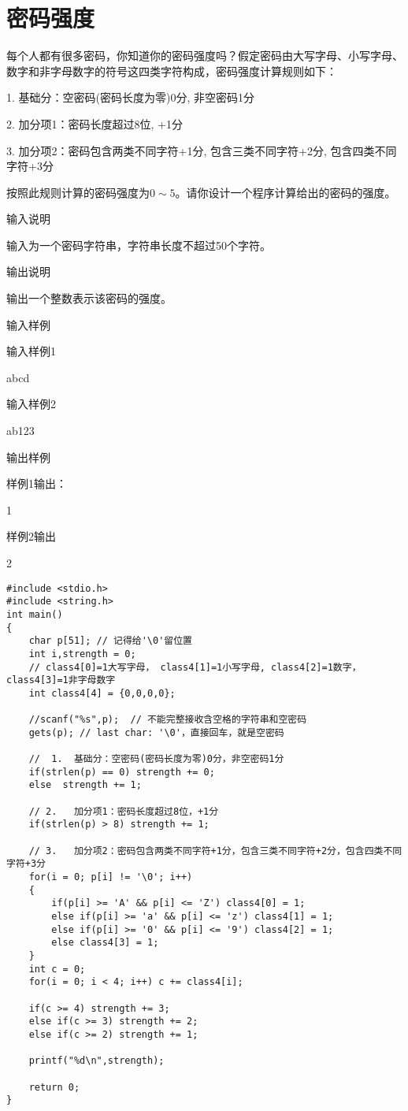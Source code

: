 \section{密码强度}
每个人都有很多密码，你知道你的密码强度吗？假定密码由大写字母、小写字母、数字和非字母数字的符号这四类字符构成，密码强度计算规则如下：

1.	基础分：空密码(密码长度为零)0分, 非空密码1分

2.	加分项1：密码长度超过8位, +1分

3.	加分项2：密码包含两类不同字符+1分, 包含三类不同字符+2分, 包含四类不同字符+3分

按照此规则计算的密码强度为$0\sim 5$。请你设计一个程序计算给出的密码的强度。

输入说明
	
输入为一个密码字符串，字符串长度不超过50个字符。

输出说明
	
输出一个整数表示该密码的强度。

输入样例
	
输入样例1

abcd

输入样例2

ab123

输出样例
	
样例1输出：

1

样例2输出

2

\begin{lstlisting}	
#include <stdio.h>
#include <string.h>
int main()
{
	char p[51]; // 记得给'\0'留位置
	int i,strength = 0;
	// class4[0]=1大写字母， class4[1]=1小写字母, class4[2]=1数字， class4[3]=1非字母数字 
	int class4[4] = {0,0,0,0};  
	
	//scanf("%s",p);  // 不能完整接收含空格的字符串和空密码 
	gets(p); // last char: '\0'，直接回车，就是空密码 
	
	// 	1.	基础分：空密码(密码长度为零)0分，非空密码1分 
	if(strlen(p) == 0) strength += 0;
	else  strength += 1;
	
	// 2.	加分项1：密码长度超过8位，+1分 
	if(strlen(p) > 8) strength += 1;
	
	// 3.	加分项2：密码包含两类不同字符+1分，包含三类不同字符+2分，包含四类不同字符+3分 
	for(i = 0; p[i] != '\0'; i++)
	{
		if(p[i] >= 'A' && p[i] <= 'Z') class4[0] = 1; 
		else if(p[i] >= 'a' && p[i] <= 'z') class4[1] = 1; 
		else if(p[i] >= '0' && p[i] <= '9') class4[2] = 1;
		else class4[3] = 1; 
	}
	int c = 0;
	for(i = 0; i < 4; i++) c += class4[i];
	
	if(c >= 4) strength += 3;
	else if(c >= 3) strength += 2;
	else if(c >= 2) strength += 1;
	
	printf("%d\n",strength);
	
	return 0;
}
\end{lstlisting}


